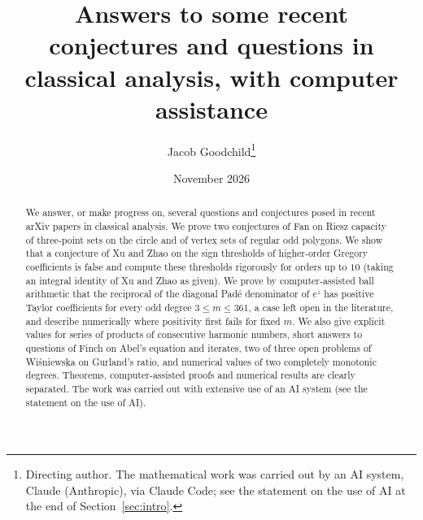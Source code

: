 
\title{Answers to some recent conjectures and questions in classical analysis, with computer assistance}
\author{Jacob Goodchild\thanks{Directing author. The mathematical work was carried out by an AI system, Claude (Anthropic), via Claude Code; see the statement on the use of AI at the end of Section~\ref{sec:intro}.}}
\date{November 2026}

\maketitle
\begin{abstract}
We answer, or make progress on, several questions and conjectures posed in recent arXiv papers in classical analysis. We prove two conjectures of Fan on Riesz capacity of three-point sets on the circle and of vertex sets of regular odd polygons. We show that a conjecture of Xu and Zhao on the sign thresholds of higher-order Gregory coefficients is false and compute these thresholds rigorously for orders up to $10$ (taking an integral identity of Xu and Zhao as given). We prove by computer-assisted ball arithmetic that the reciprocal of the diagonal Pad\'e denominator of $e^z$ has positive Taylor coefficients for every odd degree $3\le m\le361$, a case left open in the literature, and describe numerically where positivity first fails for fixed $m$. We also give explicit values for series of products of consecutive harmonic numbers, short answers to questions of Finch on Abel's equation and iterates, two of three open problems of Wi\'sniewska on Gurland's ratio, and numerical values of two completely monotonic degrees. Theorems, computer-assisted proofs and numerical results are clearly separated. The work was carried out with extensive use of an AI system (see the statement on the use of AI).
\end{abstract}











